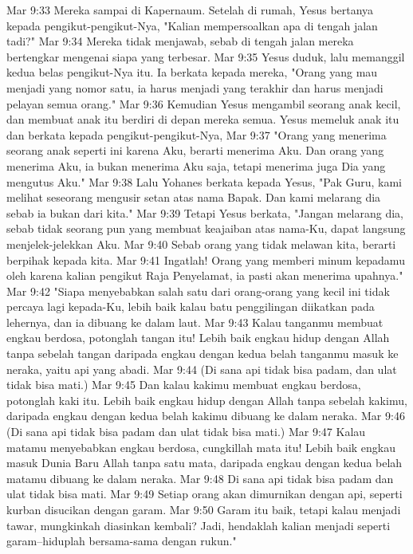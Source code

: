 Mar 9:33  Mereka sampai di Kapernaum. Setelah di rumah, Yesus bertanya kepada pengikut-pengikut-Nya, "Kalian mempersoalkan apa di tengah jalan tadi?"
Mar 9:34  Mereka tidak menjawab, sebab di tengah jalan mereka bertengkar mengenai siapa yang terbesar.
Mar 9:35  Yesus duduk, lalu memanggil kedua belas pengikut-Nya itu. Ia berkata kepada mereka, "Orang yang mau menjadi yang nomor satu, ia harus menjadi yang terakhir dan harus menjadi pelayan semua orang."
Mar 9:36  Kemudian Yesus mengambil seorang anak kecil, dan membuat anak itu berdiri di depan mereka semua. Yesus memeluk anak itu dan berkata kepada pengikut-pengikut-Nya,
Mar 9:37  "Orang yang menerima seorang anak seperti ini karena Aku, berarti menerima Aku. Dan orang yang menerima Aku, ia bukan menerima Aku saja, tetapi menerima juga Dia yang mengutus Aku."
Mar 9:38  Lalu Yohanes berkata kepada Yesus, "Pak Guru, kami melihat seseorang mengusir setan atas nama Bapak. Dan kami melarang dia sebab ia bukan dari kita."
Mar 9:39  Tetapi Yesus berkata, "Jangan melarang dia, sebab tidak seorang pun yang membuat keajaiban atas nama-Ku, dapat langsung menjelek-jelekkan Aku.
Mar 9:40  Sebab orang yang tidak melawan kita, berarti berpihak kepada kita.
Mar 9:41  Ingatlah! Orang yang memberi minum kepadamu oleh karena kalian pengikut Raja Penyelamat, ia pasti akan menerima upahnya."
Mar 9:42  "Siapa menyebabkan salah satu dari orang-orang yang kecil ini tidak percaya lagi kepada-Ku, lebih baik kalau batu penggilingan diikatkan pada lehernya, dan ia dibuang ke dalam laut.
Mar 9:43  Kalau tanganmu membuat engkau berdosa, potonglah tangan itu! Lebih baik engkau hidup dengan Allah tanpa sebelah tangan daripada engkau dengan kedua belah tanganmu masuk ke neraka, yaitu api yang abadi.
Mar 9:44  (Di sana api tidak bisa padam, dan ulat tidak bisa mati.)
Mar 9:45  Dan kalau kakimu membuat engkau berdosa, potonglah kaki itu. Lebih baik engkau hidup dengan Allah tanpa sebelah kakimu, daripada engkau dengan kedua belah kakimu dibuang ke dalam neraka.
Mar 9:46  (Di sana api tidak bisa padam dan ulat tidak bisa mati.)
Mar 9:47  Kalau matamu menyebabkan engkau berdosa, cungkillah mata itu! Lebih baik engkau masuk Dunia Baru Allah tanpa satu mata, daripada engkau dengan kedua belah matamu dibuang ke dalam neraka.
Mar 9:48  Di sana api tidak bisa padam dan ulat tidak bisa mati.
Mar 9:49  Setiap orang akan dimurnikan dengan api, seperti kurban disucikan dengan garam.
Mar 9:50  Garam itu baik, tetapi kalau menjadi tawar, mungkinkah diasinkan kembali? Jadi, hendaklah kalian menjadi seperti garam--hiduplah bersama-sama dengan rukun."
